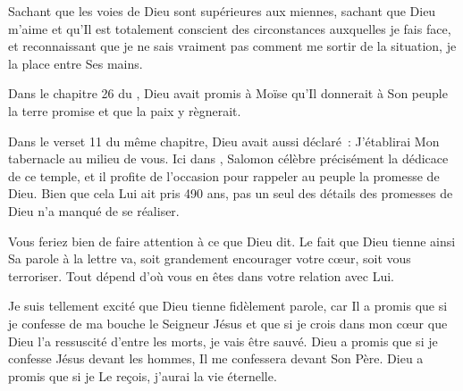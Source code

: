 Sachant que les voies de Dieu sont supérieures aux miennes,
 sachant que Dieu m'aime et qu'Il est totalement conscient des circonstances
 auxquelles je fais face, et reconnaissant que je ne sais vraiment pas comment
 me sortir de la situation, je la place entre Ses mains. 

\dvrule






Dans le chapitre 26 du , Dieu avait promis à Moïse
 qu'Il donnerait à Son peuple la terre promise et que la paix y règnerait.

Dans le verset 11 du même chapitre, Dieu avait aussi déclaré~:
 \og J'établirai Mon tabernacle au milieu de vous. \fg{}
 Ici dans , Salomon célèbre précisément
 la dédicace de ce temple, et il profite de l'occasion pour rappeler au peuple
 la promesse de Dieu.
 Bien que cela Lui ait pris 490 ans, pas un seul des détails des promesses
 de Dieu n'a manqué de se réaliser. 


Vous feriez bien de faire attention à ce que Dieu dit.
 Le fait que Dieu tienne ainsi Sa parole à la lettre va,
 soit grandement encourager votre c\oe{}ur, soit vous terroriser.
 Tout dépend d'où vous en êtes dans votre relation avec Lui. 

Je suis tellement excité que Dieu tienne fidèlement parole,
 car Il a promis que si je confesse de ma bouche le Seigneur Jésus
 et que si je crois dans mon c\oe{}ur que Dieu l'a ressuscité
 d'entre les morts, je vais être sauvé.
 Dieu a promis que si je confesse Jésus devant les hommes,
 Il me confessera devant Son Père.
 Dieu a promis que si je Le reçois, j'aurai la vie éternelle. 


\dvrule



